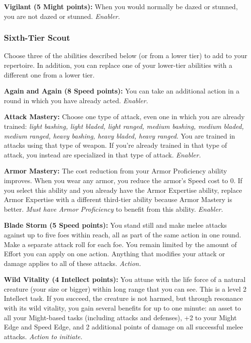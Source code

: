 \documentclass[a4paper,10pt,final,twocolumn,oneside]{book}
\newcommand{\itemAbility}[2]{\textcolor{25gray}{\textbullet\textbf{ #1:}}{ #2}\par}
\newcommand{\enabler}{\textit{ Enabler.}}
\newcommand{\action}{\textit{ Action.}}
\newcommand{\actionInit}{\textit{ Action to initiate.}}
\begin{document}
\itemAbility{Vigilant (5 Might points)}{When you would normally be dazed or stunned, you are not dazed or stunned.\enabler}


\subsubsection*{Sixth-Tier Scout}
\label{subsub:scoutSixthTier}

Choose three of the abilities described
below (or from a lower tier) to add to your
repertoire. In addition, you can replace one
of your lower-tier abilities with a different
one from a lower tier.

\itemAbility{Again and Again (8 Speed points)}{You can take an additional action in a round in which you have already acted.\enabler}

\itemAbility{Attack Mastery}{Choose one type of attack, even one in which you are already trained: \textit{light bashing, light bladed, light ranged, medium bashing, medium bladed, medium ranged, heavy bashing, heavy bladed, heavy ranged.} You are trained in attacks using that type of weapon. If you’re already trained in that type of attack, you instead are specialized in that type of attack.\enabler}

\itemAbility{Armor Mastery}{The cost reduction from your Armor Proficiency ability improves. When you wear any armor, you reduce the armor’s Speed cost to 0. If you select this ability and you already have the Armor Expertise ability, replace Armor Expertise with a different third-tier ability because Armor Mastery is better. \textit{Must have Armor Proficiency} to benefit from this ability.\enabler}

\itemAbility{Blade Storm (5 Speed points)}{You stand still and make melee attacks against up to five foes within reach, all as part of the same action in one round. Make a separate attack roll for each foe. You remain limited by the amount of Effort you can apply on one action. Anything that modifies your attack or damage applies to all of these attacks.\action}

\itemAbility{Wild Vitality (4 Intellect points)}{You attune with the life force of a natural creature (your size or bigger) within long range that you can see. This is a level 2 Intellect task. If you succeed, the creature is not harmed, but through resonance with its wild vitality, you gain several benefits for up to one minute: an asset to all your Might-based tasks (including attacks and defenses), +2 to your Might Edge and Speed Edge, and 2 additional points of damage on all successful melee attacks.\actionInit}
\end{document}
